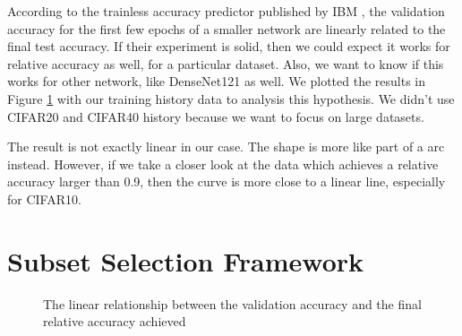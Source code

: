 According to the trainless accuracy predictor published by IBM \cite{Scheidegger2018}, the validation accuracy for the first few epochs of a smaller network are linearly related to the final test accuracy. If their experiment is solid, then we could expect it works for relative accuracy as well, for a particular dataset. Also, we want to know if this works for other network, like DenseNet121 as well. We plotted the results in Figure \ref{Fig.training_trend} with our training history data to analysis this hypothesis. We didn't use CIFAR20 and CIFAR40 history because we want to focus on large datasets.

The result is not exactly linear in our case. The shape is more like part of a arc instead. However, if we take a closer look at the data which achieves a relative accuracy larger than 0.9, then the curve is more close to a linear line, especially for CIFAR10.
\section{Subset Selection Framework}
\begin{figure}[H]
\centering  
{}
\caption{The linear relationship between the validation accuracy and the final relative accuracy achieved}
\label{Fig.training_trend}
\end{figure}

